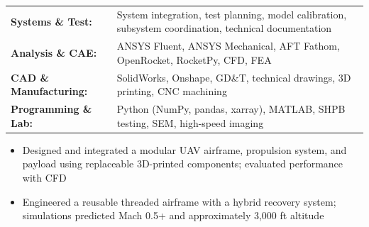 \documentclass[10pt,letterpaper]{article}
\begin{document}
\vspace{2pt}
\researchEntry

\begin{tabularx}{\textwidth}{@{}>{\bfseries}l X@{}}
Systems \& Test: & System integration, test planning, model calibration, subsystem coordination, technical documentation \\
Analysis \& CAE: & ANSYS Fluent, ANSYS Mechanical, AFT Fathom, OpenRocket, RocketPy, CFD, FEA \\
CAD \& Manufacturing: & SolidWorks, Onshape, GD\&T, technical drawings, 3D printing, CNC machining \\
Programming \& Lab: & Python (NumPy, pandas, xarray), MATLAB, SHPB testing, SEM, high-speed imaging
\end{tabularx}

\begin{itemize}
  \item Designed and integrated a modular UAV airframe, propulsion system, and payload using replaceable 3D-printed components; evaluated performance with CFD
\end{itemize}
\begin{itemize}
  \item Engineered a reusable threaded airframe with a hybrid recovery system; simulations predicted Mach 0.5+ and approximately 3,000 ft altitude
\end{itemize}
\end{document}
